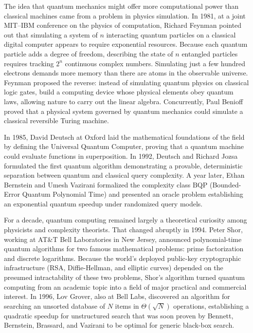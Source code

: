 \begin{historybox}
The idea that quantum mechanics might offer more computational power than
classical machines came from a problem in physics simulation. In 1981, at a joint MIT--IBM
conference on the physics of computation, Richard Feynman pointed out that
simulating a system of $n$ interacting quantum particles on a classical digital
computer appears to require exponential resources. Because each quantum particle
adds a degree of freedom, describing the state of $n$ entangled particles requires
tracking $2^n$ continuous complex numbers. Simulating just a few hundred electrons
demands more memory than there are atoms in the observable universe. Feynman proposed
the reverse: instead of simulating quantum
physics on classical logic gates, build a computing device whose physical elements
obey quantum laws, allowing nature to carry out the linear algebra.
Concurrently, Paul Benioff proved that a physical system governed by quantum mechanics could
simulate a classical reversible Turing machine.

In 1985, David Deutsch at Oxford laid the mathematical foundations of the field by
defining the Universal Quantum Computer, proving that a quantum machine could
evaluate functions in superposition. In 1992, Deutsch and Richard Jozsa formulated
the first quantum algorithm demonstrating a provable, deterministic separation
between quantum and classical query complexity. A year later, Ethan Bernstein and
Umesh Vazirani formalized the complexity class $\mathrm{BQP}$ (Bounded-Error Quantum
Polynomial Time) and presented an oracle problem establishing an exponential quantum
speedup under randomized query models.

For a decade, quantum computing remained largely a theoretical curiosity among
physicists and complexity theorists. That changed abruptly in 1994. Peter Shor,
working at AT\&T Bell Laboratories in New Jersey, announced polynomial-time quantum
algorithms for two famous mathematical problems: prime factorization and discrete
logarithms. Because the world's deployed public-key cryptographic infrastructure
(RSA, Diffie-Hellman, and elliptic curves) depended on the presumed intractability
of these two problems, Shor's algorithm turned quantum computing from an
academic topic into a field of major practical and commercial interest. In 1996, Lov Grover,
also at Bell Labs, discovered an algorithm for searching an unsorted database of $N$
items in $\Theta(\sqrt{N})$ operations, establishing a quadratic speedup for
unstructured search that was soon proven by Bennett, Bernstein, Brassard, and
Vazirani to be optimal for generic black-box search.


\end{historybox}

